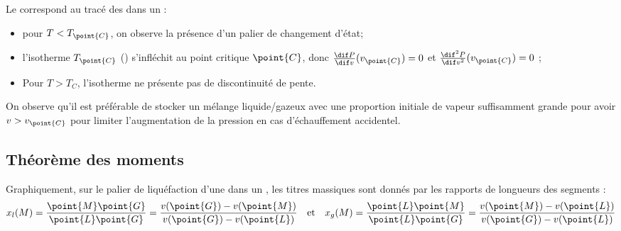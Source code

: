 \begin{definition}
Le  correspond au tracé des  dans un  :

\begin{figure}[H]
\begin{center}
\end{center}
\end{figure}

\begin{itemize}
\item pour $T < T_{\point{C}}$, on observe la présence d'un palier de changement d'état;
\item l'isotherme $T_{\point{C}}$ () s'infléchit au point critique $\point{C}$, donc $\frac{\dif P}{\dif v}(v_{\point{C}}) = 0$ et $\frac{\dif^2 P}{\dif v^2}(v_{\point{C}}) = 0$ ;
\item Pour $T > T_C$, l'isotherme ne présente pas de discontinuité de pente.
\end{itemize}
\end{definition}

\begin{remarque}
On observe qu'il est préférable de stocker un mélange liquide/gazeux avec une proportion initiale de vapeur suffisamment grande pour avoir $v > v_{\point{C}}$ pour limiter l'augmentation de la pression en cas d'échauffement accidentel.
\end{remarque}


\subsection{Théorème des moments}

\begin{theoreme}
Graphiquement, sur le palier de liquéfaction d'une  dans un , les titres massiques sont donnés par les rapports de longueurs des segments :
\[x_l(M) = \frac{\point{M}\point{G}}{\point{L}\point{G}} = \frac{v(\point{G}) - v(\point{M})}{v(\point{G}) - v(\point{L})} \quad \text{et} \quad x_g(M) = \frac{\point{L}\point{M}}{\point{L}\point{G}} = \frac{v(\point{M}) - v(\point{L})}{v(\point{G}) - v(\point{L})}
\]
\end{theoreme}

